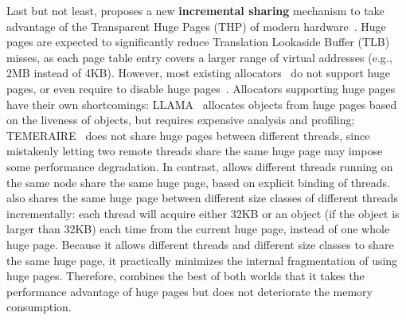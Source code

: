 Last but not least, \NM{} proposes a new \textbf{incremental sharing} mechanism to take advantage of the Transparent Huge Pages (THP) of modern hardware~\cite{hugepage}. Huge pages are expected to significantly reduce Translation Lookaside Buffer (TLB) misses, as each page table entry covers a larger range of virtual addresses (e.g., 2MB instead of 4KB). However, most existing allocators~\cite{dlmalloc, Hoard, Scalloc} do not support huge pages, or even require to disable huge pages~\cite{scallochugepage}.  Allocators supporting huge pages have their own shortcomings: LLAMA~\cite{LLAMA} allocates objects from huge pages based on the liveness of objects, but requires expensive analysis and profiling; TEMERAIRE~\cite{TEMERAIRE} does not share huge pages between different threads, since mistakenly letting two remote threads share the same huge page may impose some performance degradation.  
In contrast, \NM{} allows different threads running on the same node share the same huge page, based on explicit binding of threads. 
\NM{} also shares the same huge page between different size classes of different threads incrementally: each thread will acquire either 32KB or an object (if the object is larger than 32KB) each time from the current huge page, instead of one whole huge page. Because it allows different threads and different size classes to share the same huge page, it practically minimizes the internal fragmentation of using huge pages.  
Therefore, \NM{} combines the best of both worlds that it takes the performance advantage of huge pages but does not deteriorate the memory consumption. 




